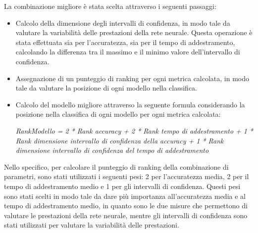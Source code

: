 La combinazione migliore è stata scelta attraverso i seguenti passaggi:
\begin{itemize}
    \item Calcolo della dimensione degli intervalli di confidenza, in modo tale
          da valutare la variabilità delle prestazioni della rete neurale.
          Questa operazione è stata effettuata sia per l'accuratezza, sia per il
          tempo di addestramento, calcolando la differenza tra il massimo e il
          minimo valore dell'intervallo di confidenza.
    \item Assegnazione di un punteggio di ranking per ogni metrica calcolata, in modo tale
          da valutare la posizione di ogni modello nella classifica.
    \item Calcolo del modello migliore attraverso la seguente formula considerando
          la posizione nella classifica di ogni modello per ogni metrica calcolata:
          \begin{center}
              \textit{RankModello = 2 * Rank accuracy + 2 * Rank tempo di addestramento + 1 * Rank dimensione intervallo di confidenza della accuracy + 1 * Rank dimensione intervallo di confidenza del tempo di addestramento}
          \end{center}
\end{itemize}

Nello specifico, per calcolare il punteggio di ranking della combinazione di parametri,
sono stati utilizzati i seguenti pesi: 2 per l'accuratezza
media, 2 per il tempo di addestramento medio e 1 per gli intervalli di
confidenza. Questi pesi sono stati scelti in modo tale da dare più importanza
all'accuratezza media e al tempo di addestramento medio, in quanto sono le due
misure che permettono di valutare le prestazioni della rete neurale, mentre gli
intervalli di confidenza sono stati utilizzati per valutare la variabilità delle
prestazioni.

